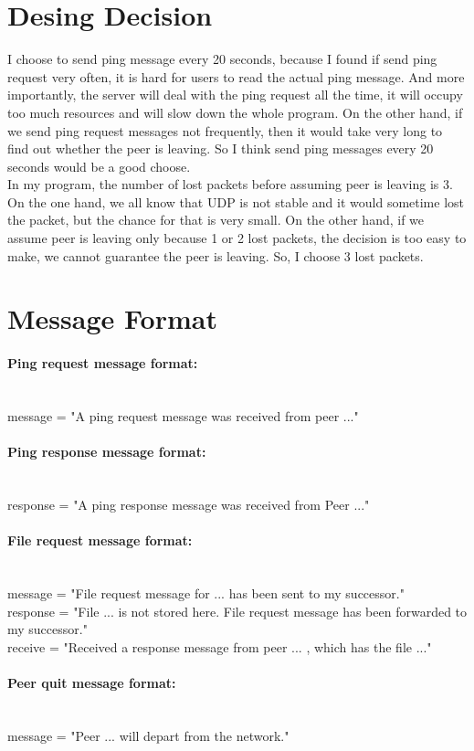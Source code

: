 \documentclass{article}
\begin{document}
  \section*{Desing Decision}
  I choose to send ping message every 20 seconds, because I found if send ping request very often, it is hard for users to read the actual ping message. And more importantly, the server will deal with the ping request all the time, it will occupy too much resources and will slow down the whole program. On the other hand, if we send ping request messages not frequently, then it would take very long to find out whether the peer is leaving. So I think send ping messages every 20 seconds would be a good choose. \\
  \newline
  In my program, the number of lost packets before assuming peer is leaving is 3. On the one hand, we all know that UDP is not stable and it would sometime lost the packet, but the chance for that is very small. On the other hand, if we assume peer is leaving only because 1 or 2 lost packets, the decision is too easy to make, we cannot guarantee the peer is leaving. So, I choose 3 lost packets.
  
  \section*{Message Format}
  \paragraph{Ping request message format:} \mbox{}\\
  message = "A ping request message was received from peer ..."
  \paragraph{Ping response message format:}\mbox{}\\
  response = "A ping response message was received from Peer ..."
  \paragraph{File request message format:}\mbox{}\\
  message = "File request message for ... has been sent to my successor." \\
  \newline
  response = "File ... is not stored here. File request message has been forwarded to my successor."\\
  \newline
  receive = "Received a response message from peer ... , which has the file ..."\\
  \paragraph{Peer quit message format:}\mbox{}\\
  message = "Peer ... will depart from the network."
  

  
\end{document}
